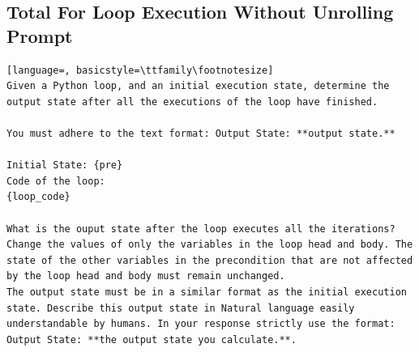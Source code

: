 \documentclass[sigconf]{acmart}
\begin{document}
\subsection{Total For Loop Execution Without Unrolling Prompt}
\label{for_NO_UNROLL_PROMPT}
\begin{tcolorbox}[ colback=gray!10, colframe=black, arc=5pt]
\begin{lstlisting}[language=, basicstyle=\ttfamily\footnotesize]
Given a Python loop, and an initial execution state, determine the output state after all the executions of the loop have finished. 

You must adhere to the text format: Output State: **output state.**

Initial State: {pre}
Code of the loop:
{loop_code}

What is the ouput state after the loop executes all the iterations? Change the values of only the variables in the loop head and body. The state of the other variables in the precondition that are not affected by the loop head and body must remain unchanged.
The output state must be in a similar format as the initial execution state. Describe this output state in Natural language easily understandable by humans. In your response strictly use the format: Output State: **the output state you calculate.**.

\end{lstlisting}
\end{tcolorbox}
\end{document}
